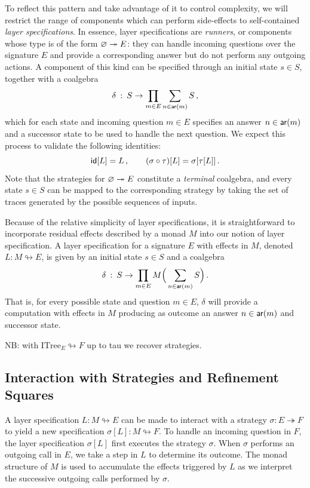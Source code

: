 To reflect this pattern and
take advantage of it to control complexity,
we will restrict the range of components which can perform side-effects
to self-contained \emph{layer specifications}.
In essence,
layer specifications are \emph{runners},
or components whose type is of the form $\varnothing \twoheadrightarrow E$:
they can handle incoming questions over the signature $E$
and provide a corresponding answer
but do not perform any outgoing actions.
A component of this kind can be specified through an initial state $s \in S$,
together with a coalgebra
\[
   \delta \: : \: S \rightarrow \prod_{m \in E} \sum_{n \in  \mathsf{ar} (m)} S
   \,,
\]
which for each state and incoming question $m \in E$
specifies an answer $n \in  \mathsf{ar} (m)$
and a successor state to be used to handle the next question.
We expect this process to validate the following identities:
\[
   \mathsf{id} [L] = L
  \,, \qquad
  (\sigma \circ \tau)[L] = \sigma[\tau[L]]
  \,.
\]
Note that the strategies for $\varnothing \twoheadrightarrow E$
constitute a \emph{terminal} coalgebra,
and every state $s \in S$ can be mapped to the corresponding strategy
by taking the set of traces generated by the possible sequences of inputs.

Because of the relative simplicity of layer specifications,
it is straightforward to incorporate residual effects described by a monad $M$
into our notion of layer specification.
A layer specification for a signature $E$ with effects in $M$,
denoted $L : M \looparrowright E$,
is given by an initial state $s \in S$ and a coalgebra
\[
    \delta \: : \: S \rightarrow
       \prod_{m \in E} M \Big( \sum_{n \in  \mathsf{ar} (m)} S \Big)
    \,.
\]
That is,
for every possible state and question $m \in E$,
$\delta$ will provide a computation with effects in $M$
producing as outcome an answer $n \in  \mathsf{ar} (m)$ and successor state.

NB: with $\mathrm{ITree}_E \looparrowright F$
up to tau we recover strategies.

\subsection{Interaction with Strategies and Refinement Squares}

A layer specification $L : M \looparrowright E$
can be made to interact with
a strategy $\sigma : E \twoheadrightarrow F$
to yield a new specification $\sigma[L] : M \looparrowright F$.
To handle an incoming question in $F$,
the layer specification $\sigma[L]$
first executes the strategy $\sigma$.
When $\sigma$ performs an outgoing call in $E$,
we take a step in $L$ to determine its outcome.
The monad structure of $M$ is used to
accumulate the effects triggered by $L$
as we interpret the successive outgoing calls
performed by $\sigma$.

